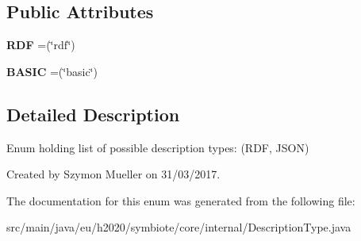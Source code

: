 \subsection*{Public Attributes}
\begin{DoxyCompactItemize}
\item 
\mbox{\label{enumeu_1_1h2020_1_1symbiote_1_1core_1_1internal_1_1DescriptionType_aa792bcbf012414682ac2472a74e88069}} 
{\bfseries R\+DF} =(\char`\"{}rdf\char`\"{})
\item 
\mbox{\label{enumeu_1_1h2020_1_1symbiote_1_1core_1_1internal_1_1DescriptionType_a71b70cb3353437cd3d91e82e03288e10}} 
{\bfseries B\+A\+S\+IC} =(\char`\"{}basic\char`\"{})
\end{DoxyCompactItemize}


\subsection{Detailed Description}
Enum holding list of possible description types\+: (R\+DF, J\+S\+ON)

Created by Szymon Mueller on 31/03/2017. 

The documentation for this enum was generated from the following file\+:\begin{DoxyCompactItemize}
\item 
src/main/java/eu/h2020/symbiote/core/internal/Description\+Type.\+java\end{DoxyCompactItemize}
